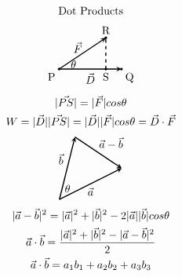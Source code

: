\documentclass{article}
\begin{document}
\begin{gather*}
    \text{Dot Products}
    \\
    \begin{tikzpicture}
        \draw[line width=1pt, black, -stealth](0,0)--(1.5,1);
        \node[anchor=south] at (0.6, 0.4) {$\vec{F}$};
        \draw[line width=1pt, black, -stealth](0,0)--(2,0);
        \node[anchor=north] at (1,0) {$\vec{D}$};
        \node[anchor= west] at (0.25,0.15) {$\theta$};
        \draw[line width=1pt, black, dashed](1.5,0)--(1.5,1);
        \filldraw[black] (0,0) circle(1pt) node[anchor=north east]{P};
        \filldraw[black] (1.5,0) circle(1pt) node[anchor=north]{S};
        \filldraw[black] (2,0) circle(1pt) node[anchor=north west]{Q};
        \filldraw[black] (1.5,1) circle(1pt) node[anchor=south]{R};
    \end{tikzpicture}
    \\
    |\vec{PS}|=|\vec{F}|cos\theta
    \\
    W=|\vec{D}||\vec{PS}|=|\vec{D}||\vec{F}|cos\theta=\vec{D}\cdot\vec{F}
    \\
    \begin{tikzpicture}
        \draw[line width=1pt, black, -stealth](0,0)--(0.5,2);
        \node[anchor=south east] at (0.25, 1) {$\vec{b}$};
        \draw[line width=1pt, black, -stealth](0,0)--(2,1);
        \node[anchor=north] at (1, 0.5) {$\vec{a}$};
        \draw[line width=1pt, black, -stealth](0.5,2)--(2,1);
        \node[anchor=south west] at (1.15, 1.5) {$\vec{a}-\vec{b}$};
        \node[anchor=south west] at (0.05, 0.1) {$\theta$};
    \end{tikzpicture}
    \\
    |\vec{a}-\vec{b}|^2=|\vec{a}|^2+|\vec{b}|^2-2|\vec{a}||\vec{b}|cos\theta
    \\
    \vec{a}\cdot\vec{b}=\frac{|\vec{a}|^2+|\vec{b}|^2-|\vec{a}-\vec{b}|^2}{2}
    \\
    \vec{a}\cdot\vec{b}=a_1b_1+a_2b_2+a_3b_3
\end{gather*}



\end{document}
